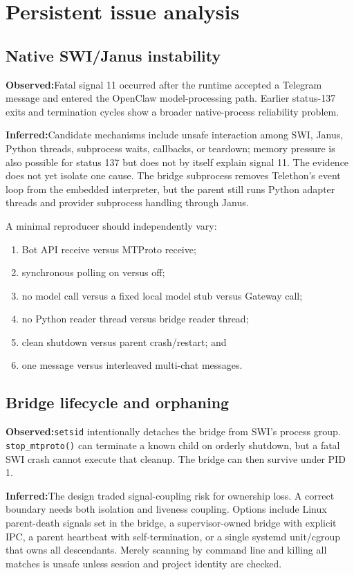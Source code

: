 \documentclass[10pt]{article}
\newcommand{\code}[1]{\texttt{#1}}
\newcommand{\observed}{\textbf{Observed:}}
\newcommand{\inferred}{\textbf{Inferred:}}
\begin{document}
\section{Persistent issue analysis}

\subsection{Native SWI/Janus instability}

\observed Fatal signal 11 occurred after the runtime accepted a Telegram message and entered the OpenClaw model-processing path. Earlier status-137 exits and termination cycles show a broader native-process reliability problem.

\inferred Candidate mechanisms include unsafe interaction among SWI, Janus, Python threads, subprocess waits, callbacks, or teardown; memory pressure is also possible for status 137 but does not by itself explain signal 11. The evidence does not yet isolate one cause. The bridge subprocess removes Telethon's event loop from the embedded interpreter, but the parent still runs Python adapter threads and provider subprocess handling through Janus.

A minimal reproducer should independently vary:
\begin{enumerate}
  \item Bot API receive versus MTProto receive;
  \item synchronous polling on versus off;
  \item no model call versus a fixed local model stub versus Gateway call;
  \item no Python reader thread versus bridge reader thread;
  \item clean shutdown versus parent crash/restart; and
  \item one message versus interleaved multi-chat messages.
\end{enumerate}

\subsection{Bridge lifecycle and orphaning}

\observed \code{setsid} intentionally detaches the bridge from SWI's process group. \code{stop\_mtproto()} can terminate a known child on orderly shutdown, but a fatal SWI crash cannot execute that cleanup. The bridge can then survive under PID 1.

\inferred The design traded signal-coupling risk for ownership loss. A correct boundary needs both isolation and liveness coupling. Options include Linux parent-death signals set in the bridge, a supervisor-owned bridge with explicit IPC, a parent heartbeat with self-termination, or a single systemd unit/cgroup that owns all descendants. Merely scanning by command line and killing all matches is unsafe unless session and project identity are checked.
\end{document}
